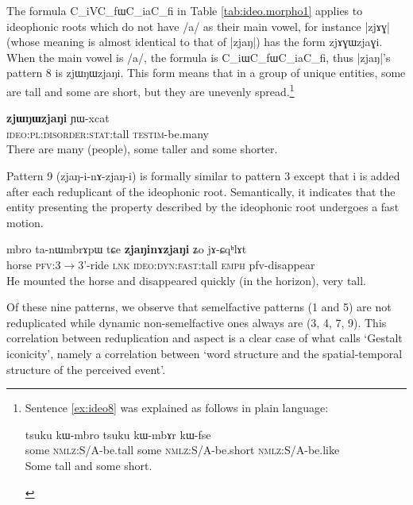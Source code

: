 \documentclass[oldfontcommands,oneside,a4paper,11pt]{article}
\newcommand{\ipa}[1]{{\phon \mbox{#1}}} %
\begin{document}
	The formula C_iVC_f\ipa{ɯ}C_i\ipa{a}C_f\ipa{i}  in Table \ref{tab:ideo.morpho1} applies to ideophonic roots  which do  not have /a/ as their main vowel, for instance |\ipa{zjɤɣ}| (whose meaning is almost identical to that of |\ipa{zjaŋ}|) has the form \ipa{zjɤɣɯzjaɣi}. When the main vowel is /a/, the formula is C_i\ipa{ɯ}C_f\ipa{ɯ}C_i\ipa{a}C_f\ipa{i}, thus |\ipa{zjaŋ}|'s pattern 8 is \ipa{zjɯŋɯzjaŋi}. This form means that in a group of unique entities, some are tall and some are short, but  they are unevenly spread.\footnote{Sentence \ref{ex:ideo8} was explained as follows in plain language:
 
 \begin{exe} 
\ex  \label{ex:zjWNWzjaNi:expl}
\gll 
 \ipa{tsuku}  	\ipa{kɯ-mbro}  	\ipa{tsuku}  	\ipa{kɯ-mbɤr}  	\ipa{kɯ-fse}  \\
 some \textsc{nmlz}:S/A-be.tall some \textsc{nmlz}:S/A-be.short \textsc{nmlz}:S/A-be.like \\
 \glt Some tall and some short.
  \end{exe} }
    \begin{exe} 
\ex  \label{ex:ideo8}
\gll 
\ipa{\textbf{zjɯŋɯzjaŋi}}  	\ipa{ɲɯ-xcat}  \\
\textsc{ideo:pl:disorder:stat}:tall \textsc{testim}-be.many \\
\glt There are many (people), some taller and some shorter. 
  \end{exe}

Pattern 9 (\ipa{zjaŋ-i-nɤ-zjaŋ-i}) is formally similar to pattern 3 except that \ipa{i} is added after each reduplicant of the ideophonic root. Semantically, it indicates that the entity presenting the property described by the ideophonic root undergoes a fast motion.

    \begin{exe} 
\ex  \label{ex:ideo9}
\gll 
\ipa{mbro}  	\ipa{ta-nɯmbrɤpɯ}  	\ipa{tɕe}  	\ipa{\textbf{zjaŋinɤzjaŋi}}  	\ipa{ʑo}  	\ipa{jɤ-ɕqʰlɤt}  \\
horse \textsc{pfv}:3$\rightarrow$3'-ride \textsc{lnk} \textsc{ideo:dyn:fast}:tall \textsc{emph} pfv-disappear \\
\glt He mounted the horse and disappeared quickly (in the horizon), very tall.
   \end{exe}


Of these nine patterns, we observe that semelfactive  patterns (1 and 5) are not reduplicated while dynamic non-semelfactive ones always are (3, 4, 7, 9). This correlation between reduplication and aspect is a clear case of what \citet[47]{dingemanse11ezra} calls `Gestalt iconicity', namely a correlation between `word structure and the spatial-temporal structure of the perceived event'. 
 
\end{document}
